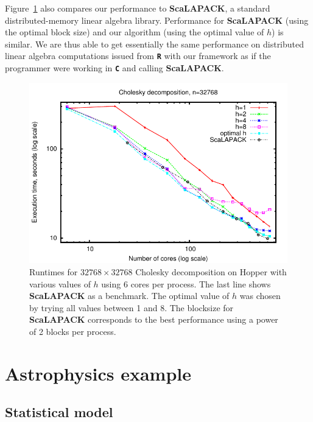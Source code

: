 \documentclass[12pt]{article}
\newcommand{\proglang}[1]{\textbf{\texttt{#1}}}
\newcommand{\pkg}[1]{\textbf{#1}}
\begin{document}
Figure~\ref{fig:vary-h} also compares our performance to \pkg{ScaLAPACK}, a standard distributed-memory linear algebra library.  Performance for \pkg{ScaLAPACK} (using the optimal block size) and our algorithm (using the optimal value of \(h\)) is similar.  We are thus able to get essentially the same performance on distributed linear algebra computations issued from \proglang{R} with our framework as if the programmer were working in \proglang{C} and calling \pkg{ScaLAPACK}.

\begin{figure}
  \centering
  \includegraphics[scale=1]{figs/plota}
  \caption{Runtimes for \(32768\times32768\) Cholesky decomposition on Hopper with various values of $h$ using $6$ cores per process.  The last line shows \pkg{ScaLAPACK} as a benchmark.  The optimal value of $h$ was chosen by trying all values between 1 and 8.  The blocksize for \pkg{ScaLAPACK} corresponds to the best performance using a power of 2 blocks per process.}
  \label{fig:vary-h}
\end{figure}



\section{Astrophysics example}
\label{sec:example}


 
\subsection{Statistical model}
\end{document}
